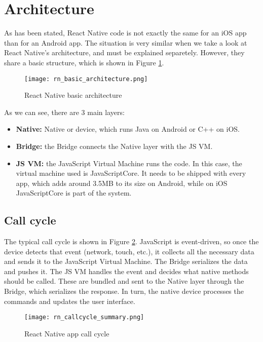 \section{Architecture}

As has been stated, React Native code is not exactly the same for an iOS app than for an Android app. The situation is very similar when we take a look at React Native's architecture, and must be explained separetely. However, they share a basic structure, which is shown in Figure \ref{fig:rnbasicarch}.

\begin{figure}[H]
	\centering
	\texttt{[image: rn\_basic\_architecture.png]}
	\caption{React Native basic architecture\label{fig:rnbasicarch}}
\end{figure}

As we can see, there are 3 main layers:

\begin{itemize}
 \item \textbf{Native:} Native or device, which runs Java on Android or C++ on iOS.
 \item \textbf{Bridge:} the Bridge connects the Native layer with the JS VM.
 \item \textbf{JS VM:} the JavaScript Virtual Machine runs the code. In this case, the virtual machine used is JavaScriptCore. It needs to be shipped with every app, which adds around 3.5MB to its size on Android, while on iOS JavaScriptCore is part of the system.
\end{itemize}

\subsection{Call cycle}

The typical  call cycle is shown in Figure \ref{fig:rncallcyclesummary}. JavaScript is event-driven, so once the device detects that event (network, touch, etc.), it collects all the necessary data and sends it to the JavaScript Virtual Machine. The Bridge serializes the data and pushes it. The JS VM handles the event and decides what native methods should be called. These are bundled and sent to the Native layer through the Bridge, which serializes the response. In turn, the native device processes the commands and updates the user interface.

\begin{figure}[H]
	\centering
	\texttt{[image: rn\_callcycle\_summary.png]}
	\caption{React Native app call cycle\label{fig:rncallcyclesummary}}
\end{figure}